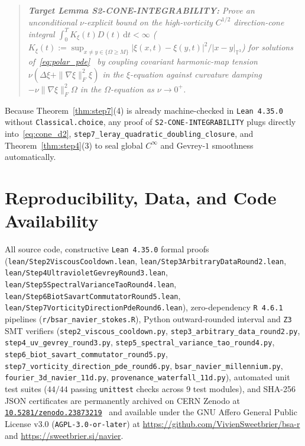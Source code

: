 \documentclass[11pt]{article}
\theoremstyle{plain}
\theoremstyle{definition}
\begin{document}
\begin{quote}
\emph{\textbf{Target Lemma S2-CONE-INTEGRABILITY:} Prove an unconditional $\nu$-explicit bound on the high-vorticity $C^{1/2}$ direction-cone integral $\int_0^T K_\xi(t)D(t)\,\mathrm{d}t < \infty$ ($K_\xi(t) := \sup_{x\ne y \in \{\Omega \ge M\}} |\xi(x,t)-\xi(y,t)|^2/|x-y|_{\mathbb{T}^3}$) for solutions of~\eqref{eq:polar_pde}~\cite{ckn1982,cf1993,ess2003} by coupling covariant harmonic-map tension $\nu(\Delta\xi + \|\nabla\xi\|_F^2\xi)$ in the $\xi$-equation against curvature damping $-\nu\|\nabla\xi\|_F^2\Omega$ in the $\Omega$-equation as $\nu \to 0^+$.}
\end{quote}
Because Theorem~\ref{thm:step7}(4) is already machine-checked in \texttt{Lean 4.35.0} without \texttt{Classical.choice}, any proof of \texttt{S2-CONE-INTEGRABILITY} plugs directly into~\eqref{eq:cone_d2}, \texttt{step7\_leray\_\allowbreak quadratic\_\allowbreak doubling\_closure}, and Theorem~\ref{thm:step4}(3) to seal global $C^\infty$ and Gevrey-$1$ smoothness automatically.

\section*{Reproducibility, Data, and Code Availability}
All source code, constructive \texttt{Lean 4.35.0} formal proofs (\texttt{lean/\allowbreak Step2ViscousCooldown.lean}, \texttt{lean/\allowbreak Step3ArbitraryDataRound2.lean}, \texttt{lean/\allowbreak Step4UltravioletGevreyRound3.lean}, \texttt{lean/\allowbreak Step5Spectral\allowbreak VarianceTaoRound4.lean}, \texttt{lean/\allowbreak Step6BiotSavart\allowbreak CommutatorRound5.lean}, \texttt{lean/\allowbreak Step7Vorticity\allowbreak DirectionPdeRound6.lean}), zero-dependency \texttt{R 4.6.1} pipelines (\texttt{r/\allowbreak bsar\_navier\_\allowbreak stokes.R}), Python outward-rounded interval and \texttt{Z3} SMT verifiers (\texttt{step2\_viscous\_\allowbreak cooldown.py}, \texttt{step3\_arbitrary\_\allowbreak data\_round2.py}, \texttt{step4\_uv\_\allowbreak gevrey\_round3.py}, \texttt{step5\_spectral\_\allowbreak variance\_tao\_round4.py}, \texttt{step6\_biot\_savart\_\allowbreak commutator\_round5.py}, \texttt{step7\_vorticity\_\allowbreak direction\_pde\_round6.py}, \texttt{bsar\_navier\_\allowbreak millennium.py}, \texttt{fourier\_3d\_\allowbreak navier\_11d.py}, \texttt{provenance\_\allowbreak waterfall\_11d.py}), automated unit test suites ($44/44$ passing \texttt{unittest} checks across $9$ test modules), and SHA-256 JSON certificates are permanently archived on CERN Zenodo at \href{https://doi.org/10.5281/zenodo.23873219}{\texttt{10.5281/zenodo.23873219}}~\cite{duguay2026zenodo} and available under the GNU Affero General Public License v3.0 (\texttt{AGPL-3.0-or-later}) at \url{https://github.com/VivienSweetbrier/bsa-r} and \url{https://sweetbrier.si/navier}.
\end{document}

